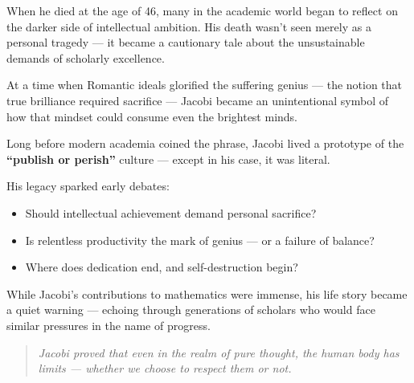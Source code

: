    \medskip
    
    When he died at the age of 46, many in the academic world began to reflect on the darker side of intellectual ambition. His death wasn’t seen merely as a personal tragedy — it became a cautionary tale about the unsustainable demands of scholarly excellence.
    
    \medskip
    
    At a time when Romantic ideals glorified the suffering genius — the notion that true brilliance required sacrifice — Jacobi became an unintentional symbol of how that mindset could consume even the brightest minds.
    
    \begin{tcolorbox}[colback=white, colframe=gray!50!black, title={The Birth of "Publish or Perish"?}, fonttitle=\bfseries]
    Long before modern academia coined the phrase,  
    Jacobi lived a prototype of the \textbf{“publish or perish”} culture —  
    except in his case, it was literal.
    \end{tcolorbox}
    
    His legacy sparked early debates:
    
    \begin{itemize}
      \item Should intellectual achievement demand personal sacrifice?
      \item Is relentless productivity the mark of genius — or a failure of balance?
      \item Where does dedication end, and self-destruction begin?
    \end{itemize}
    
    \medskip
    
    While Jacobi’s contributions to mathematics were immense, his life story became a quiet warning — echoing through generations of scholars who would face similar pressures in the name of progress.
    
    \begin{quote}
    \textit{Jacobi proved that even in the realm of pure thought,  
    the human body has limits — whether we choose to respect them or not.}
    \end{quote}
    

